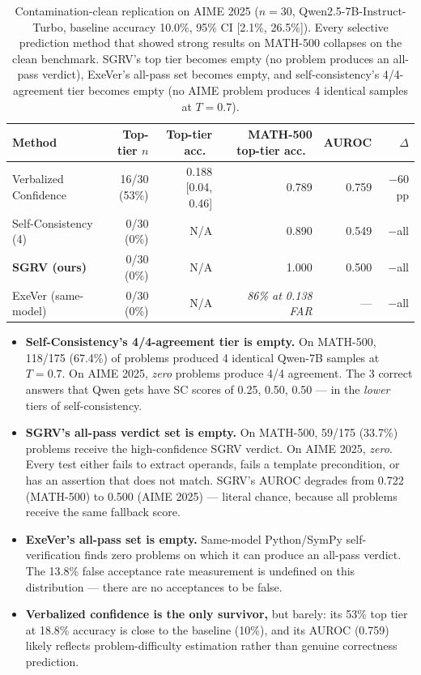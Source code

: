 \documentclass{article}
\begin{document}
\begin{table}[t]
\centering
\caption{Contamination-clean replication on AIME 2025 ($n=30$, Qwen2.5-7B-Instruct-Turbo, baseline accuracy 10.0\%, 95\% CI [2.1\%, 26.5\%]). Every selective prediction method that showed strong results on MATH-500 collapses on the clean benchmark. SGRV's top tier becomes empty (no problem produces an all-pass verdict), ExeVer's all-pass set becomes empty, and self-consistency's 4/4-agreement tier becomes empty (no AIME problem produces 4 identical samples at $T{=}0.7$).}
\label{tab:contam}
\small
\begin{tabular}{lrrrrr}
\toprule
Method & Top-tier $n$ & Top-tier acc.\ & MATH-500 top-tier acc.\ & AUROC & $\Delta$ \\
\midrule
Verbalized Confidence & 16/30 (53\%) & 0.188 [0.04, 0.46] & 0.789 & 0.759 & $-60$pp \\
Self-Consistency (4)  & 0/30 (0\%)   & N/A                 & 0.890 & 0.549 & $-$all \\
\textbf{SGRV (ours)}  & 0/30 (0\%)   & N/A                 & 1.000 & 0.500 & $-$all \\
ExeVer (same-model)   & 0/30 (0\%)   & N/A                 & \textit{86\% at 0.138 FAR} & --- & $-$all \\
\bottomrule
\end{tabular}
\end{table}

\begin{itemize}[leftmargin=*,itemsep=1pt]
\item \textbf{Self-Consistency's 4/4-agreement tier is empty.} On MATH-500, 118/175 (67.4\%) of problems produced 4 identical Qwen-7B samples at $T{=}0.7$. On AIME 2025, \emph{zero} problems produce 4/4 agreement. The 3 correct answers that Qwen gets have SC scores of 0.25, 0.50, 0.50 --- in the \emph{lower} tiers of self-consistency.
\item \textbf{SGRV's all-pass verdict set is empty.} On MATH-500, 59/175 (33.7\%) problems receive the high-confidence SGRV verdict. On AIME 2025, \emph{zero}. Every test either fails to extract operands, fails a template precondition, or has an assertion that does not match. SGRV's AUROC degrades from 0.722 (MATH-500) to 0.500 (AIME 2025) --- literal chance, because all problems receive the same fallback score.
\item \textbf{ExeVer's all-pass set is empty.} Same-model Python/SymPy self-verification finds zero problems on which it can produce an all-pass verdict. The 13.8\% false acceptance rate measurement is undefined on this distribution --- there are no acceptances to be false.
\item \textbf{Verbalized confidence is the only survivor,} but barely: its 53\% top tier at 18.8\% accuracy is close to the baseline (10\%), and its AUROC (0.759) likely reflects problem-difficulty estimation rather than genuine correctness prediction.
\end{itemize}
\end{document}
